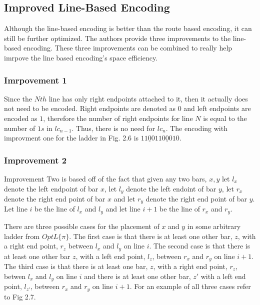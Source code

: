 \subsection{Improved Line-Based Encoding}
Although the line-based encoding is better than the route based 
encoding, it can still be further optimized. The authors provide 
three improvements to the line-based encoding. These three improvements
can be combined to really help imrpove the line based encoding's 
space efficiency. 
\subsubsection{Imrpovement 1}
Since the $Nth$ line has only right endpoints attached to it, 
then it actually does not need to be encoded. Right endpoints 
are denoted as $0$ and left endpoints are encoded as $1$, therefore the number of right endpoints 
for line $N$ is equal to the number of $1s$ in $lc_{n-1}$.
Thus, there is no need for $lc_{n}$. The encoding with improvment 
one for the ladder in Fig. 2.6 is $11\underline{0}0110\underline{0}010$.
\subsubsection{Improvement 2}
Improvement Two is based off of the fact that given any two bars,
$x,y$ let $l_{x}$ denote the left endpoint of bar $x$, let 
$l_{y}$ denote the left endoint of bar $y$, let $r_{x}$ denote 
the right end point of bar $x$ and let $r_{y}$ denote the right 
end point of bar $y$. Let line $i$ be the line of $l_{x}$ and $l_{y}$
and let line $i+1$ be the line of $r_{x}$ and $r_{y}$.
\begin{theorem}
There are three possible cases for the 
placement of $x$ and $y$ in some 
arbitrary ladder from $OptL\{\pi\}$. The first case is that there 
is at least one other bar, $z$, with a right end point, $r_{z}$ between $l_{x}$
and $l_{y}$ on line $i$. The second case is that there is at least one other bar 
$z$, with a left end point, $l_{z}$, between $r_{x}$ and $r_{y}$ on line $i+1$. 
The third case is that there is at least one bar, $z$, with a right end point, 
$r_{z}$, betwen $l_{x}$ and $l_{y}$ on line $i$ and there is at least one other bar, 
$z\prime$ with a left end point, $l_{z\prime}$, between $r_{x}$ and $r_{y}$ on line $i+1$. 
For an example of all three cases refer to Fig 2.7.\par
\end{theorem}

